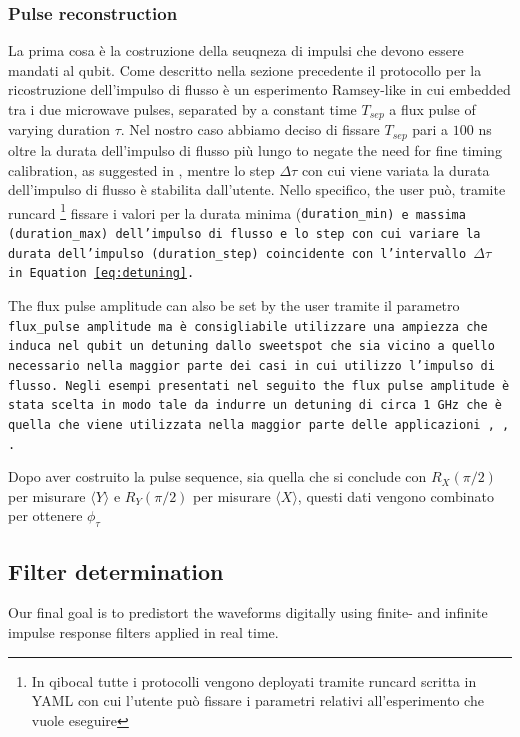 \subsubsection{Pulse reconstruction}
La prima cosa è la costruzione della seuqneza di impulsi che devono essere mandati al qubit.
Come descritto nella sezione precedente il protocollo per la ricostruzione dell'impulso di flusso è un esperimento Ramsey-like in cui embedded tra i due microwave pulses, separated by a constant time $T_{sep}$ a flux pulse of varying duration $\tau$.
Nel nostro caso abbiamo deciso di fissare $T_{sep}$ pari a $100$ ns oltre la durata dell'impulso di flusso più lungo to negate the need for fine timing calibration, as suggested in \cite{rol_time-domain_2020}, mentre lo step $\Delta\tau$ con cui viene variata la durata dell'impulso di flusso è stabilita dall'utente.
Nello specifico, the user può, tramite runcard \footnote{In qibocal tutte i protocolli vengono deployati tramite runcard scritta in YAML con cui l'utente può fissare i parametri relativi all'esperimento che vuole eseguire} fissare i valori per la durata minima (\tt{duration\_min}) e massima (\tt{duration\_max}) dell'impulso di flusso e lo step con cui variare la durata dell'impulso (\tt{duration\_step}) coincidente con l'intervallo $\Delta\tau$ in Equation \ref{eq:detuning}.

The flux pulse amplitude can also be set by the user tramite il parametro \tt{flux\_pulse amplitude} ma è consigliabile utilizzare una ampiezza che induca nel qubit un detuning dallo sweetspot che sia vicino a quello necessario nella maggior parte dei casi in cui utilizzo l'impulso di flusso.
Negli esempi presentati nel seguito the flux pulse amplitude è stata scelta in modo tale da indurre un detuning di circa 1 GHz che è quella che viene utilizzata nella maggior parte delle applicazioni \cite{Langford2017}, \cite{Bultink_2020}, \cite{Rol2019iju}.

Dopo aver costruito la pulse sequence, sia quella che si conclude con $R_X(\pi/2)$ per misurare $\langle Y \rangle$ e $R_Y(\pi/2)$ per misurare $\langle X \rangle$, questi dati vengono combinato per ottenere $\phi_\tau$

\subsection{Filter determination}
Our final goal is to predistort the waveforms digitally using finite- and infinite impulse response filters applied in real time.

